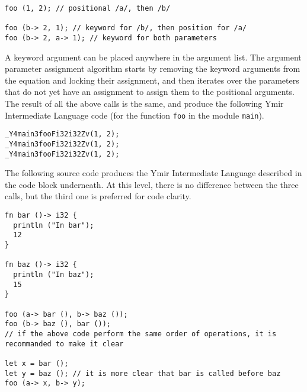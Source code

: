 \begin{lstlisting}[style=coloredverbatim]
foo (1, 2); // positional /a/, then /b/

foo (b-> 2, 1); // keyword for /b/, then position for /a/
foo (b-> 2, a-> 1); // keyword for both parameters
\end{lstlisting}

A keyword argument can be placed anywhere in the argument list. The argument
parameter assignment algorithm starts by removing the keyword arguments from the
equation and locking their assignment, and then iterates over the parameters
that do not yet have an assignment to assign them to the positional arguments.
The result of all the above calls is the same, and produce the following Ymir
Intermediate Language code (for the function \texttt{foo} in the module
\texttt{main}).

\begin{lstlisting}[style=intermediateVerb]
_Y4main3fooFi32i32Zv(1, 2);
_Y4main3fooFi32i32Zv(1, 2);
_Y4main3fooFi32i32Zv(1, 2);
\end{lstlisting}



The following source code produces the Ymir Intermediate Language described in
the code block underneath. At this level, there is no difference between the
three calls, but the third one is preferred for code clarity.

\begin{lstlisting}[style=coloredverbatim]
fn bar ()-> i32 {
  println ("In bar");
  12
}

fn baz ()-> i32 {
  println ("In baz");
  15
}

foo (a-> bar (), b-> baz ());
foo (b-> baz (), bar ());
// if the above code perform the same order of operations, it is recommanded to make it clear

let x = bar ();
let y = baz (); // it is more clear that bar is called before baz
foo (a-> x, b-> y);
\end{lstlisting}
\smallskip

